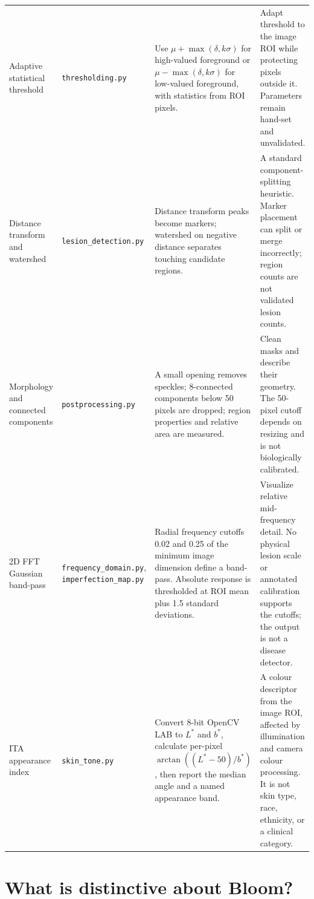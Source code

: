 \documentclass[11pt,a4paper]{article}
\begin{document}
\begin{tabularx}{\textwidth}{@{}p{}p{}X p{}@{}}
Adaptive statistical threshold & \texttt{thresholding.py} & Use $\mu+\max(\delta,k\sigma)$ for high-valued foreground or $\mu-\max(\delta,k\sigma)$ for low-valued foreground, with statistics from ROI pixels. & Adapt threshold to the image ROI while protecting pixels outside it. Parameters remain hand-set and unvalidated. \\
Distance transform and watershed & \texttt{lesion\_detection.py} & Distance transform peaks become markers; watershed on negative distance separates touching candidate regions. & A standard component-splitting heuristic. Marker placement can split or merge incorrectly; region counts are not validated lesion counts. \\
Morphology and connected components & \texttt{postprocessing.py} & A small opening removes speckles; 8-connected components below 50 pixels are dropped; region properties and relative area are measured. & Clean masks and describe their geometry. The 50-pixel cutoff depends on resizing and is not biologically calibrated. \\
2D FFT Gaussian band-pass & \texttt{frequency\_domain.py}, \texttt{imperfection\_map.py} & Radial frequency cutoffs 0.02 and 0.25 of the minimum image dimension define a band-pass. Absolute response is thresholded at ROI mean plus 1.5 standard deviations. & Visualize relative mid-frequency detail. No physical lesion scale or annotated calibration supports the cutoffs; the output is not a disease detector. \\
ITA appearance index & \texttt{skin\_tone.py} & Convert 8-bit OpenCV LAB to $L^*$ and $b^*$, calculate per-pixel $\arctan((L^*-50)/b^*)$, then report the median angle and a named appearance band. & A colour descriptor from the image ROI, affected by illumination and camera colour processing. It is not skin type, race, ethnicity, or a clinical category. \\
\bottomrule
\end{tabularx}
\normalsize

\section{What is distinctive about Bloom?}
\end{document}
